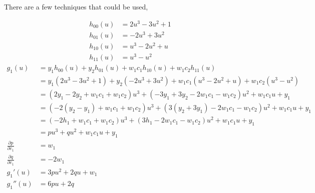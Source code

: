 \documentclass{article}
\begin{document}
There are a few techniques that could be used,

\newcommand{\dx}{\, \mathrm{d}x}
\newcommand{\du}{\, \mathrm{d}u}
\newcommand{\ddx}[1]{\frac{\mathrm{d}#1}{\mathrm{d}x}}

\newpage
\begin{align*}
  h_{00}(u)
  &= 2u^3-3u^2+1 \\
  h_{01}(u)
  &= -2u^3+3u^2 \\
  h_{10}(u)
  &= u^3-2u^2+u \\
  h_{11}(u)
  &= u^3-u^2
\end{align*}
\begin{align*}
  g_1(u)
  &= y_1h_{00}(u)+y_2h_{01}(u)+w_1c_1h_{10}(u)+w_1c_2h_{11}(u) \\
  &= y_1(2u^3-3u^2+1)+y_2(-2u^3+3u^2)+w_1c_1(u^3-2u^2+u)+w_1c_2(u^3-u^2) \\
  &= (2y_1-2y_2+w_1c_1+w_1c_2)u^3+(-3y_1+3y_2-2w_1c_1-w_1c_2)u^2+w_1c_1u+y_1 \\
  &= (-2(y_2-y_1)+w_1c_1+w_1c_2)u^3+(3(y_2+3y_1)-2w_1c_1-w_1c_2)u^2+w_1c_1u+y_1 \\
  &= (-2h_1+w_1c_1+w_1c_2)u^3+(3h_1-2w_1c_1-w_1c_2)u^2+w_1c_1u+y_1 \\
  &= pu^3+qu^2+w_1c_1u+y_1 \\
  \frac{\partial p}{\partial c_1}
  &= w_1 \\
  \frac{\partial q}{\partial c_1}
  &= -2w_1 \\
  g_1'(u)
  &= 3pu^2+2qu+w_1 \\
  g_1''(u)
  &= 6pu+2q
\end{align*}
\end{document}
